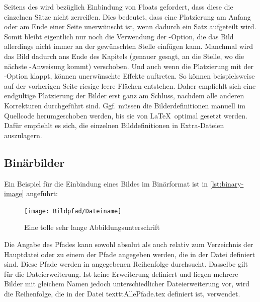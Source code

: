 Seitens des  wird bezüglich Einbindung von Floats gefordert,
dass diese die einzelnen Sätze nicht zerreißen.
Dies bedeutet, dass eine Platzierung am Anfang oder am Ende einer Seite
unerwünscht ist, wenn dadurch ein Satz aufgeteilt wird.
Somit bleibt eigentlich nur noch die Verwendung der -Option,
die das Bild allerdings nicht immer an der gewünschten Stelle einfügen kann.
Manchmal wird das Bild dadurch ans Ende des Kapitels
(genauer gesagt, an die Stelle, wo die nächste -Anweisung kommt)
verschoben.
Und auch wenn die Platzierung mit der -Option klappt,
können unerwünschte Effekte auftreten.
So können beispielsweise auf der vorherigen Seite riesige leere Flächen entstehen.
Daher empfiehlt sich eine endgültige Platzierung der Bilder erst ganz am Schluss,
nachdem alle anderen Korrekturen durchgeführt sind.
Ggf. müssen die Bilderdefinitionen manuell im Quellcode herumgeschoben werden,
bis sie von \LaTeX\ optimal gesetzt werden.
Dafür empfiehlt es sich, die einzelnen Bilddefinitionen in Extra-Dateien auszulagern.

\subsection[Binärbilder]{Binärbilder}%
\label{sec:Binaerbilder}
%
Ein Beispiel für die Einbindung eines Bildes im Binärformat ist in \cref{lst:binary-image} angeführt:

\begin{latex}[caption={Einbindung einer Binärgrafik in LaTeX},label={lst:binary-image}]
\begin{figure}[h]%
  \centering%
  \texttt{[image: Bildpfad/Dateiname]}%
  \caption[Kurzversion für das Abbildungsverzeichnis]{%
           Eine tolle sehr lange Abbildungsunterschrift}%
  \label{fig:my-binary-image}%
\end{figure}
\end{latex}

Die Angabe des Pfades kann sowohl absolut als auch relativ
zum Verzeichnis der Hauptdatei oder zu einem der Pfade angegeben werden,
die in der Datei  definiert sind.
Diese Pfade werden in angegebenen Reihenfolge durchsucht.
Dasselbe gilt für die Dateierweiterung.
Ist keine Erweiterung definiert und liegen mehrere Bilder mit gleichem Namen jedoch unterschiedlicher Dateierweiterung vor,
wird die Reihenfolge, die in der Datei texttt{AllePfade.tex} definiert ist, verwendet.


